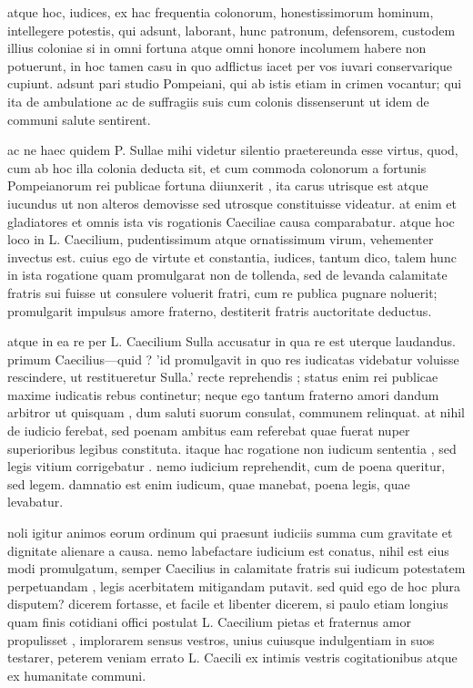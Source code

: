  atque hoc, iudices, ex hac frequentia colonorum, honestissimorum hominum, intellegere potestis, qui adsunt, laborant, hunc patronum, defensorem, custodem illius coloniae si in omni fortuna atque omni honore incolumem habere non potuerunt, in hoc tamen casu in quo adflictus iacet per vos iuvari conservarique cupiunt. adsunt pari studio Pompeiani, qui ab istis etiam in crimen vocantur; qui ita de ambulatione ac de suffragiis suis cum colonis dissenserunt ut idem de communi salute sentirent.

 ac ne haec quidem P. Sullae mihi videtur silentio praetereunda esse virtus, quod, cum ab hoc illa colonia deducta sit, et cum commoda colonorum a fortunis Pompeianorum rei publicae fortuna diiunxerit , ita carus utrisque est atque iucundus ut non alteros demovisse sed utrosque constituisse videatur. at enim et gladiatores et omnis ista vis rogationis Caeciliae causa comparabatur. atque hoc loco in L. Caecilium, pudentissimum atque ornatissimum virum, vehementer invectus est. cuius ego de virtute et constantia, iudices, tantum dico, talem hunc in ista rogatione quam promulgarat non de tollenda, sed de levanda calamitate fratris sui fuisse ut consulere voluerit fratri, cum re publica pugnare noluerit; promulgarit impulsus amore fraterno, destiterit fratris auctoritate deductus.

 atque in ea re per L. Caecilium Sulla accusatur in qua re est uterque laudandus. primum Caecilius—quid ? 'id promulgavit in quo res iudicatas videbatur voluisse rescindere, ut restitueretur Sulla.' recte reprehendis ; status enim rei publicae maxime iudicatis rebus continetur; neque ego tantum fraterno amori dandum arbitror ut quisquam , dum saluti suorum consulat, communem relinquat. at nihil de iudicio ferebat, sed poenam ambitus eam referebat quae fuerat nuper superioribus legibus constituta. itaque hac rogatione non iudicum sententia , sed legis vitium corrigebatur . nemo iudicium reprehendit, cum de poena queritur, sed legem. damnatio est enim iudicum, quae manebat, poena legis, quae levabatur.

 noli igitur animos eorum ordinum qui praesunt iudiciis summa cum gravitate et dignitate alienare a causa. nemo labefactare iudicium est conatus, nihil est eius modi promulgatum, semper Caecilius in calamitate fratris sui iudicum potestatem perpetuandam , legis acerbitatem mitigandam putavit. sed quid ego de hoc plura disputem? dicerem fortasse, et facile et libenter dicerem, si paulo etiam longius quam finis cotidiani offici postulat L. Caecilium pietas et fraternus amor propulisset , implorarem sensus vestros, unius cuiusque indulgentiam in suos testarer, peterem veniam errato L. Caecili ex intimis vestris cogitationibus atque ex humanitate communi.

